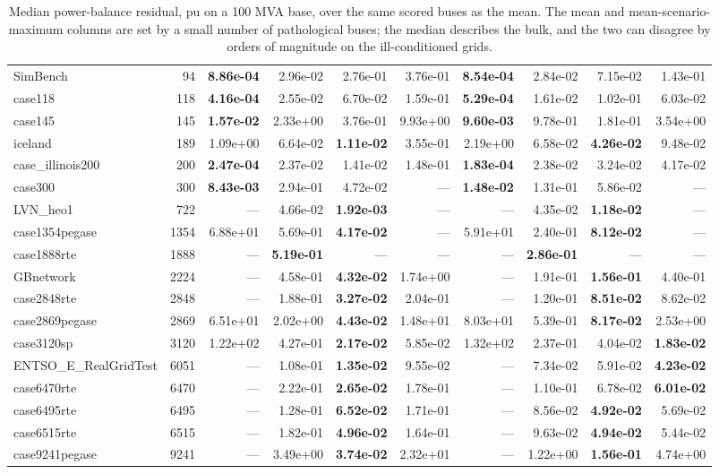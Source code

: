 \documentclass[10pt]{article}
\begin{document}
\begin{table}[H]
\begin{tabular}{lr rrrr rrrr}
SimBench & 94 & \textbf{8.86e-04} & 2.96e-02 & 2.76e-01 & 3.76e-01 & \textbf{8.54e-04} & 2.84e-02 & 7.15e-02 & 1.43e-01 \\
case118 & 118 & \textbf{4.16e-04} & 2.55e-02 & 6.70e-02 & 1.59e-01 & \textbf{5.29e-04} & 1.61e-02 & 1.02e-01 & 6.03e-02 \\
case145 & 145 & \textbf{1.57e-02} & 2.33e+00 & 3.76e-01 & 9.93e+00 & \textbf{9.60e-03} & 9.78e-01 & 1.81e-01 & 3.54e+00 \\
iceland & 189 & 1.09e+00 & 6.64e-02 & \textbf{1.11e-02} & 3.55e-01 & 2.19e+00 & 6.58e-02 & \textbf{4.26e-02} & 9.48e-02 \\
case\_illinois200 & 200 & \textbf{2.47e-04} & 2.37e-02 & 1.41e-02 & 1.48e-01 & \textbf{1.83e-04} & 2.38e-02 & 3.24e-02 & 4.17e-02 \\
case300 & 300 & \textbf{8.43e-03} & 2.94e-01 & 4.72e-02 & --- & \textbf{1.48e-02} & 1.31e-01 & 5.86e-02 & --- \\
LVN\_heo1 & 722 & --- & 4.66e-02 & \textbf{1.92e-03} & --- & --- & 4.35e-02 & \textbf{1.18e-02} & --- \\
case1354pegase & 1354 & 6.88e+01 & 5.69e-01 & \textbf{4.17e-02} & --- & 5.91e+01 & 2.40e-01 & \textbf{8.12e-02} & --- \\
case1888rte & 1888 & --- & \textbf{5.19e-01} & --- & --- & --- & \textbf{2.86e-01} & --- & --- \\
GBnetwork & 2224 & --- & 4.58e-01 & \textbf{4.32e-02} & 1.74e+00 & --- & 1.91e-01 & \textbf{1.56e-01} & 4.40e-01 \\
case2848rte & 2848 & --- & 1.88e-01 & \textbf{3.27e-02} & 2.04e-01 & --- & 1.20e-01 & \textbf{8.51e-02} & 8.62e-02 \\
case2869pegase & 2869 & 6.51e+01 & 2.02e+00 & \textbf{4.43e-02} & 1.48e+01 & 8.03e+01 & 5.39e-01 & \textbf{8.17e-02} & 2.53e+00 \\
case3120sp & 3120 & 1.22e+02 & 4.27e-01 & \textbf{2.17e-02} & 5.85e-02 & 1.32e+02 & 2.37e-01 & 4.04e-02 & \textbf{1.83e-02} \\
ENTSO\_E\_RealGridTest & 6051 & --- & 1.08e-01 & \textbf{1.35e-02} & 9.55e-02 & --- & 7.34e-02 & 5.91e-02 & \textbf{4.23e-02} \\
case6470rte & 6470 & --- & 2.22e-01 & \textbf{2.65e-02} & 1.78e-01 & --- & 1.10e-01 & 6.78e-02 & \textbf{6.01e-02} \\
case6495rte & 6495 & --- & 1.28e-01 & \textbf{6.52e-02} & 1.71e-01 & --- & 8.56e-02 & \textbf{4.92e-02} & 5.69e-02 \\
case6515rte & 6515 & --- & 1.82e-01 & \textbf{4.96e-02} & 1.64e-01 & --- & 9.63e-02 & \textbf{4.94e-02} & 5.44e-02 \\
case9241pegase & 9241 & --- & 3.49e+00 & \textbf{3.74e-02} & 2.32e+01 & --- & 1.22e+00 & \textbf{1.56e-01} & 4.74e+00 \\
\bottomrule
\end{tabular}
\caption{Median power-balance residual, pu on a 100 MVA base, over the same scored
buses as the mean. The mean and mean-scenario-maximum columns are set by a small number
of pathological buses; the median describes the bulk, and the two can disagree
by orders of magnitude on the ill-conditioned grids.}
\end{table}
\end{document}
